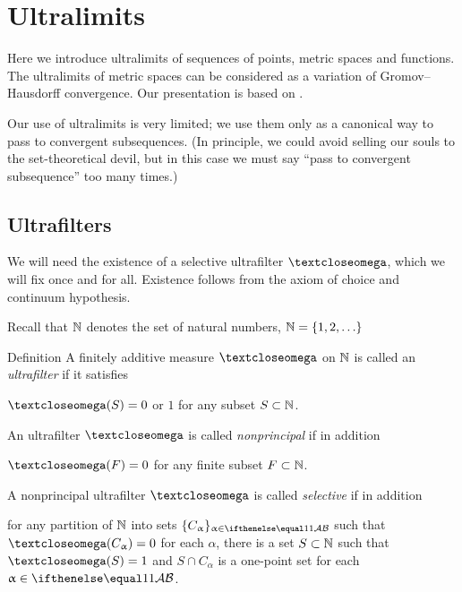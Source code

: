 \chapter{Ultralimits}

Here we introduce ultralimits of sequences of points, metric spaces and functions.
The ultralimits of metric spaces can be considered as a variation of Gromov--Hausdorff convergence.
Our presentation is based on \cite{kleiner-leeb}.

Our use of ultralimits is very limited; 
we use them only as a canonical way to pass to  convergent subsequences.
(In principle, we could avoid selling our souls 
to the set-theoretical devil, but in this case we must say ``pass to convergent subsequence'' too many times.)%

\section{Ultrafilters}

We will need the existence of a 
selective ultrafilter $\o$,
which we will fix once and for all.
Existence follows from the axiom of choice and continuum hypothesis.

Recall that $\mathbb{N}$ denotes the set of natural numbers, $\NN=\{1,2,\dots\}$

\begin{thm}{Definition}\label{def:ultrafilter}
A finitely additive measure $\o$ 
on  $\mathbb{N}$ 
is called an \emph{ultrafilter} if it satisfies 
\begin{subthm}{}
$\o(S)=0$ or $1$ for any subset $S\subset \NN$.
\end{subthm}
An ultrafilter $\o$ is called 
\emph{nonprincipal} if in addition 
\begin{subthm}{}
$\o(F)=0$ for any finite subset $F\subset \NN$.
\end{subthm}
A nonprincipal ultrafilter $\o$ is called 
\emph{selective} if in addition 
\begin{subthm}{}
for any partition of $\mathbb{N}$ into sets $\{C_\alpha\}_{\alpha\in\IndexSet}$ such that $\o(C_\alpha)\z=0$ for each $\alpha$, 
there is a set $S\subset \NN$ such that $\o(S)=1$ and $S\cap C_\alpha$ is a one-point set for each $\alpha\in\IndexSet$.
\end{subthm}
\end{thm}

